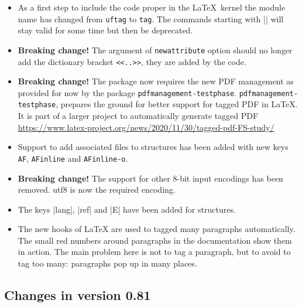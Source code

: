 \documentclass[DIV=12,parskip=half-,bibliography=totoc,a4paper]{article}
\newcommand\pkg[1]{\texttt{#1}}
\begin{document}
\begin{itemize}
\item  As a first step to include the code proper in the \LaTeX\ kernel the module name has changed from \texttt{uftag} to \texttt{tag}. The commands starting with |\uftag| will stay valid for some time but then be deprecated.

\item \textbf{Breaking change!} The argument of \texttt{newattribute} option should no longer add the dictionary bracket \verb+<<..>>+, they are added by the code.


\item \textbf{Breaking change!} The package now requires the new PDF management as provided for now by the package \pkg{pdfmanagement-testphase}. \pkg{pdfmanagement-testphase},
prepares the ground for better support for tagged PDF in \LaTeX{}.
It is part of a larger project to automatically generate tagged PDF \url{https://www.latex-project.org/news/2020/11/30/tagged-pdf-FS-study/}

\item Support to add associated files to structures has been added with new keys \texttt{AF}, \texttt{AFinline} and \texttt{AFinline-o}.

\item \textbf{Breaking change!} The support for other 8-bit input encodings has been removed.
utf8 is now the required encoding.

\item The keys |lang|, |ref| and |E| have been added for structures.

\item The new hooks of LaTeX are used to tagged many paragraphs automatically. The small red numbers around paragraphs in the documentation show them in action. The main problem here is not to tag a paragraph, but to avoid to tag too many: paragraphs pop up in many places.
\end{itemize}

\subsection{Changes in version 0.81}
\end{document}
